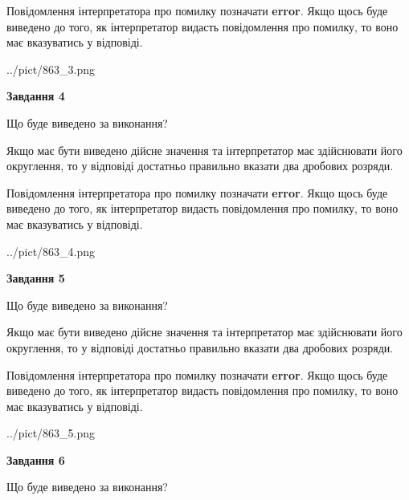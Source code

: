 \documentclass[12pt, ukrainian]{article}
\begin{document}
{\begin {Large}
Повідомлення інтерпретатора про помилку позначати \textbf{error}.
Якщо щось буде виведено до того, як інтерпретатор видасть повідомлення про помилку, 
то воно має вказуватись у відповіді. \par

\begin{center}
	{../pict/863_3.png}
\end{center}
\newpage

{\begin {center}\textbf{Завдання 4}\end {center}}\par
Що буде виведено за виконання? \par

Якщо має бути виведено дійсне значення та інтерпретатор має здійснювати його округлення, 
то у відповіді достатньо правильно вказати два дробових розряди.

Повідомлення інтерпретатора про помилку позначати \textbf{error}.
Якщо щось буде виведено до того, як інтерпретатор видасть повідомлення про помилку, 
то воно має вказуватись у відповіді. \par

\begin{center}
	{../pict/863_4.png}
\end{center}
\newpage

{\begin {center}\textbf{Завдання 5}\end {center}}\par
Що буде виведено за виконання? \par

Якщо має бути виведено дійсне значення та інтерпретатор має здійснювати його округлення, 
то у відповіді достатньо правильно вказати два дробових розряди.

Повідомлення інтерпретатора про помилку позначати \textbf{error}.
Якщо щось буде виведено до того, як інтерпретатор видасть повідомлення про помилку, 
то воно має вказуватись у відповіді. \par

\begin{center}
	{../pict/863_5.png}
\end{center}
\newpage

{\begin {center}\textbf{Завдання 6}\end {center}}\par
Що буде виведено за виконання? \par


\end{Large}}
\end{document}
